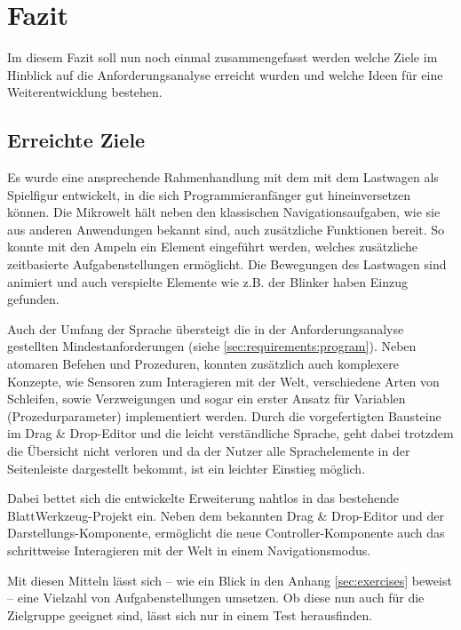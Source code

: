 \chapter{Fazit}
\label{sec:conclusion}

Im diesem Fazit soll nun noch einmal zusammengefasst werden welche Ziele im Hinblick auf die Anforderungsanalyse erreicht wurden und welche Ideen für eine Weiterentwicklung bestehen.

\section{Erreichte Ziele}
\label{sec:conclusion:archived}

Es wurde eine ansprechende Rahmenhandlung mit dem mit dem Lastwagen als Spielfigur entwickelt, in die sich Programmieranfänger gut hineinversetzen können. Die Mikrowelt hält neben den klassischen Navigationsaufgaben, wie sie aus anderen Anwendungen bekannt sind, auch zusätzliche Funktionen bereit. So konnte mit den Ampeln ein Element eingeführt werden, welches zusätzliche zeitbasierte Aufgabenstellungen ermöglicht. Die Bewegungen des Lastwagen sind animiert und auch verspielte Elemente wie z.B. der Blinker haben Einzug gefunden.

Auch der Umfang der Sprache übersteigt die in der Anforderungsanalyse gestellten Mindestanforderungen (siehe \ref{sec:requirements:program}). Neben atomaren Befehen und Prozeduren, konnten zusätzlich auch komplexere Konzepte, wie Sensoren zum Interagieren mit der Welt, verschiedene Arten von Schleifen, sowie Verzweigungen und sogar ein erster Ansatz für Variablen (Prozedurparameter) implementiert werden. Durch die vorgefertigten Bausteine im Drag \& Drop-Editor und die leicht verständliche Sprache, geht dabei trotzdem die Übersicht nicht verloren und da der Nutzer alle Sprachelemente in der Seitenleiste dargestellt bekommt, ist ein leichter Einstieg möglich.

Dabei bettet sich die entwickelte Erweiterung nahtlos in das bestehende BlattWerkzeug-Projekt ein. Neben dem bekannten Drag \& Drop-Editor und der Darstellungs-Komponente, ermöglicht die neue Controller-Komponente auch das schrittweise Interagieren mit der Welt in einem Navigationsmodus.

Mit diesen Mitteln lässt sich -- wie ein Blick in den Anhang \ref{sec:exercises} beweist -- eine Vielzahl von Aufgabenstellungen umsetzen. Ob diese nun auch für die Zielgruppe geeignet sind, lässt sich nur in einem Test herausfinden.

